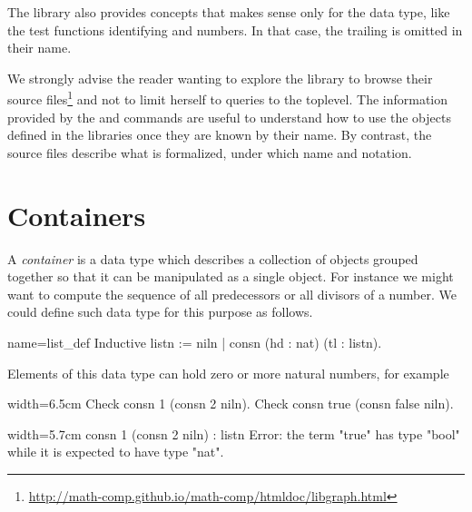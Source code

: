 The \mcbMC{} library also provides concepts that makes sense only
for the  data type, like the
test functions identifying  and  numbers. In that
case, the trailing  is omitted in their name.

We strongly advise the reader wanting to explore the \mcbMC{} library
to browse their source
files\footnote{\url{http://math-comp.github.io/math-comp/htmldoc/libgraph.html}}
and not to limit herself to queries to the toplevel. The
information provided by the  and  commands are
useful to understand how to use the objects defined in the libraries
once they are known by their name. By contrast, the source
files describe what is formalized, under which name and notation.



\section{Containers}\label{sec:poly}


A \emph{container} is a data type which describes a collection of
objects grouped together so that it can be manipulated as a single
object. For instance we might want to compute the sequence of all
predecessors or all divisors of a number.  We could define such data
type for this purpose as follows.

\begin{coq}{name=list_def}{}
Inductive listn := niln | consn (hd : nat) (tl : listn).
\end{coq}

Elements of this data type can hold zero or more natural numbers, for example

\begin{coq}{}{width=6.5cm}
Check consn 1 (consn 2 niln).
Check consn true (consn false niln).
$~$
$~$
\end{coq}{}{}
\begin{coqout}{}{width=5.7cm}
consn 1 (consn 2 niln) : listn
Error: the term "true" has
type "bool" while it is
expected to have type "nat".
\end{coqout}{}{}

